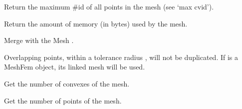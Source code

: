 \documentclass[a4paper,11pt,english]{sphinxmanual}
\begin{document}
\begin{fulllineitems}
\begin{fulllineitems}
\end{fulllineitems}


\begin{fulllineitems}
\label{\detokenize{python/cmdref_Mesh:getfem.Mesh.max_pid}}
Return the maximum \#id of all points in the mesh (see ‘max cvid’).

\end{fulllineitems}


\begin{fulllineitems}
\label{\detokenize{python/cmdref_Mesh:getfem.Mesh.memsize}}
Return the amount of memory (in bytes) used by the mesh.

\end{fulllineitems}


\begin{fulllineitems}
\label{\detokenize{python/cmdref_Mesh:getfem.Mesh.merge}}
Merge with the Mesh .

Overlapping points, within a tolerance radius , will not be
duplicated. If  is a MeshFem object, its linked mesh will be used.

\end{fulllineitems}


\begin{fulllineitems}
\label{\detokenize{python/cmdref_Mesh:getfem.Mesh.nbcvs}}
Get the number of convexes of the mesh.

\end{fulllineitems}


\begin{fulllineitems}
\label{\detokenize{python/cmdref_Mesh:getfem.Mesh.nbpts}}
Get the number of points of the mesh.


\end{fulllineitems}
\end{fulllineitems}
\end{document}
